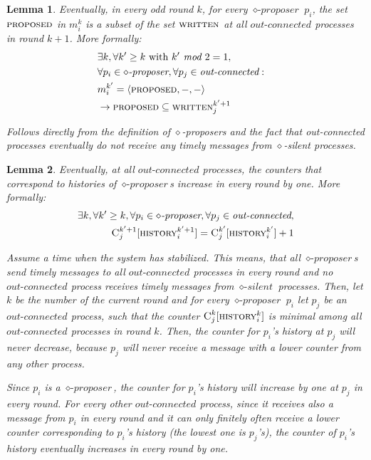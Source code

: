\documentclass[conference, compsoc]{IEEEtran}
\newtheorem{lemma}{Lemma}
\def\proposed{\textsc{proposed}}
\def\written{\textsc{written}}
\def\history{\textsc{history}}
\def\C{\textsc{C}}
\def\proposer{\diamond\textit{-proposer}}
\def\out{\textit{out-connected}}
\def\silent{\diamond\textit{-silent}}
\def\m{m}
\begin{document}
\begin{lemma} \label{lem:propwritten}
 Eventually, in every odd round $k$, for every $\proposer$ $p_i$, the set $\proposed$ in $\m_{i}^k$ is a subset of the set $\written$ at all $\out$ processes in round $k+1$. More formally:
 \begin{eqnarray*}
  & \exists k, \forall k' \ge k \mbox{ with } k' \emph{ mod } 2 = 1, &  \\
  & \forall p_i \in \proposer, \forall p_j \in \out: & \\
  & \m_{i}^{k'} = \langle \proposed, -, - \rangle & \\
  & \rightarrow \proposed \subseteq \written_{j}^{k'+1} & \\
 \end{eqnarray*}
 \begin{IEEEproof}
  Follows directly from the definition of $\diamond$-proposers and the fact that out-connected processes eventually do not receive any timely messages from $\diamond$-silent processes.
 \end{IEEEproof}

\end{lemma}

\begin{lemma}
 \label{lem:by1}
 Eventually, at all $\out$ processes, the counters that correspond to histories of $\proposer$s increase in every round by one. More formally:
 \begin{eqnarray*}
  \exists k, \forall k' \ge k, \forall p_i \in \proposer, \forall p_j \in \out, \\ 
  \C_{j}^{k'+1} [\history_{i}^{k'+1}] = \C_{j}^{k'} [\history_{i}^{k'}] + 1 
 \end{eqnarray*}
 \begin{IEEEproof}
  Assume a time when the system has stabilized. This means, that all $\proposer$s send timely messages to all $\out$ processes in every round and no $\out$ process receives timely messages from $\silent$ processes. Then, let $k$ be the number of the current round and for every $\proposer$ $p_i$ let $p_j$ be an $\out$ process, such that the counter $\C_{j}^k [\history_{i}^k]$ is minimal among all $\out$ processes in round $k$. Then, the counter for $p_i$'s history at $p_j$ will never decrease, because $p_j$ will never receive a message with a lower counter from any other process.
  
Since $p_i$ is a $\proposer$, the counter for $p_i$'s history will increase by one at $p_j$ in every round. For every other $\out$ process, since it receives also a message from $p_i$ in every round and it can only finitely often receive a lower counter corresponding to $p_i$'s history (the lowest one is $p_j$'s), the counter of $p_i$'s history eventually increases in every round by one. 
 \end{IEEEproof}

\end{lemma}
\end{document}
